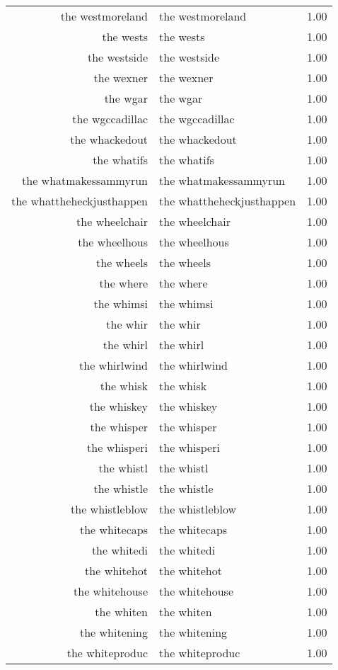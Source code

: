 \begin{table}[ht]
\begin{tabular}{rlr}
  the westmoreland & the westmoreland & 1.00 \\ 
  the wests & the wests & 1.00 \\ 
  the westside & the westside & 1.00 \\ 
  the wexner & the wexner & 1.00 \\ 
  the wgar & the wgar & 1.00 \\ 
  the wgccadillac & the wgccadillac & 1.00 \\ 
  the whackedout & the whackedout & 1.00 \\ 
  the whatifs & the whatifs & 1.00 \\ 
  the whatmakessammyrun & the whatmakessammyrun & 1.00 \\ 
  the whattheheckjusthappen & the whattheheckjusthappen & 1.00 \\ 
  the wheelchair & the wheelchair & 1.00 \\ 
  the wheelhous & the wheelhous & 1.00 \\ 
  the wheels & the wheels & 1.00 \\ 
  the where & the where & 1.00 \\ 
  the whimsi & the whimsi & 1.00 \\ 
  the whir & the whir & 1.00 \\ 
  the whirl & the whirl & 1.00 \\ 
  the whirlwind & the whirlwind & 1.00 \\ 
  the whisk & the whisk & 1.00 \\ 
  the whiskey & the whiskey & 1.00 \\ 
  the whisper & the whisper & 1.00 \\ 
  the whisperi & the whisperi & 1.00 \\ 
  the whistl & the whistl & 1.00 \\ 
  the whistle & the whistle & 1.00 \\ 
  the whistleblow & the whistleblow & 1.00 \\ 
  the whitecaps & the whitecaps & 1.00 \\ 
  the whitedi & the whitedi & 1.00 \\ 
  the whitehot & the whitehot & 1.00 \\ 
  the whitehouse & the whitehouse & 1.00 \\ 
  the whiten & the whiten & 1.00 \\ 
  the whitening & the whitening & 1.00 \\ 
  the whiteproduc & the whiteproduc & 1.00 \\ 

\end{tabular}
\end{table}
